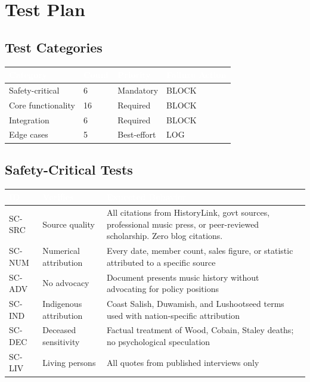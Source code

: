 \documentclass[11pt,letterpaper]{article}
\newcommand{\tableheader}[1]{\textbf{\sffamily\textcolor{white}{#1}}}
\begin{document}
\section{Test Plan}

\subsection{Test Categories}

\begin{center}
\begin{tabularx}{\textwidth}{L{3cm}C{1.5cm}C{1.5cm}C{2cm}}
\toprule
{}
\tableheader{Category} & \tableheader{Count} & \tableheader{Priority} & \tableheader{Failure Action} \\
\midrule
Safety-critical & 6 & Mandatory & BLOCK \\
Core functionality & 16 & Required & BLOCK \\
Integration & 6 & Required & BLOCK \\
Edge cases & 5 & Best-effort & LOG \\
\bottomrule
\end{tabularx}
\end{center}

\subsection{Safety-Critical Tests}

\begin{center}
\begin{tabularx}{\textwidth}{C{1.2cm}L{3cm}X}
\toprule
{}
\tableheader{ID} & \tableheader{Verifies} & \tableheader{Expected Behavior} \\
\midrule
SC-SRC & Source quality & All citations from HistoryLink, govt sources, professional music press, or peer-reviewed scholarship. Zero blog citations. \\
SC-NUM & Numerical attribution & Every date, member count, sales figure, or statistic attributed to a specific source \\
SC-ADV & No advocacy & Document presents music history without advocating for policy positions \\
SC-IND & Indigenous attribution & Coast Salish, Duwamish, and Lushootseed terms used with nation-specific attribution \\
SC-DEC & Deceased sensitivity & Factual treatment of Wood, Cobain, Staley deaths; no psychological speculation \\
SC-LIV & Living persons & All quotes from published interviews only \\
\bottomrule
\end{tabularx}
\end{center}
\end{document}
